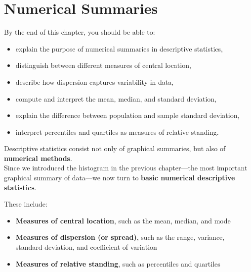 \documentclass[
  letterpaper,
  DIV=11,
  numbers=noendperiod]{scrreprt}
\providecommand{\tightlist}{%
  \setlength{\itemsep}{0pt}\setlength{\parskip}{0pt}}
\begin{document}

\chapter{Numerical Summaries}\label{ch3}

\begin{tcolorbox}[enhanced jigsaw, coltitle=black, colbacktitle=quarto-callout-note-color!10!white, left=2mm, bottomrule=.15mm, bottomtitle=1mm, colback=white, titlerule=0mm, colframe=quarto-callout-note-color-frame, breakable, leftrule=.75mm, toptitle=1mm, opacitybacktitle=0.6, rightrule=.15mm, title=\textcolor{quarto-callout-note-color}{\faInfo}\hspace{0.5em}{Learning objectives}, arc=.35mm, opacityback=0, toprule=.15mm]

By the end of this chapter, you should be able to:

\begin{itemize}
\tightlist
\item
  explain the purpose of numerical summaries in descriptive statistics,
\item
  distinguish between different measures of central location,
\item
  describe how dispersion captures variability in data,
\item
  compute and interpret the mean, median, and standard deviation,
\item
  explain the difference between population and sample standard
  deviation,
\item
  interpret percentiles and quartiles as measures of relative standing.
\end{itemize}

\end{tcolorbox}

Descriptive statistics consist not only of graphical summaries, but also
of \textbf{numerical methods}.\\
Since we introduced the histogram in the previous chapter---the most
important graphical summary of data---we now turn to \textbf{basic
numerical descriptive statistics}.

These include:

\begin{itemize}
\tightlist
\item
  \textbf{Measures of central location}, such as the mean, median, and
  mode\\
\item
  \textbf{Measures of dispersion (or spread)}, such as the range,
  variance, standard deviation, and coefficient of variation\\
\item
  \textbf{Measures of relative standing}, such as percentiles and
  quartiles
\end{itemize}
\end{document}
